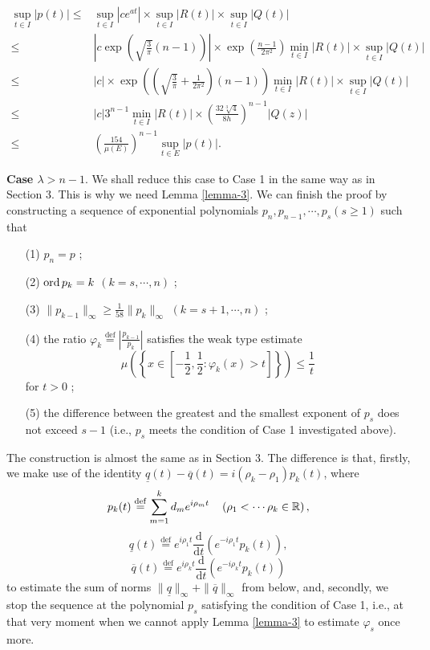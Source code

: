 \begin{equation*}
  \begin{aligned}
    \sup_{t\in I}\left| p(t) \right|\le & \sup_{t\in I}\left| ce^{at} \right|\times  \sup_{t\in I}\left| R(t) \right|\times \sup_{t\in I}\left| Q(t) \right|  \\
    \le  & \left| c\exp\left( \sqrt{\frac{3}{\pi}} (n-1) \right)  \right| \times \exp\left( \frac{n-1}{2\pi^2} \right) \min_{t\in I}\left| R(t) \right| \times \sup_{t\in I}\left| Q(t) \right|\\
    \le  & \left| c \right| \times \exp\left( \left( \sqrt{\frac{3}{\pi}} +\frac{1}{2\pi^2} \right) (n-1) \right) \min_{t\in I}\left| R(t) \right| \times \sup_{t\in I}\left| Q(t) \right|\\
    \le & \left| c \right| 3^{n-1} \min_{t\in I}\left| R(t) \right| \times \left( \frac{32\sqrt[3]{4} }{8h} \right) ^{n-1}\left| Q(z) \right|   \\
    \le  & \left( \frac{154}{\mu(E)} \right)^{n-1}\sup_{t\in E}\left| p(t) \right| . 
  \end{aligned}
\end{equation*}

\textbf{Case $\lambda > n-1$}. We shall reduce this case to Case 1 in the same way as in Section 3. This is why we need Lemma \ref{lemma-3}. We can finish the proof by constructing a sequence of exponential polynomials $p_n,p_{n-1},\cdots,p_s(s\ge 1)$ such that 
\begin{itemize}
  \item [(1)] $p_n=p$ ;
  \item [(2)]  $\operatorname{ord} p_k=k$ $(k=s,\cdots,n)$ ;
  \item [(3)] $\|p_{k-1}\|_{\infty}\ge \frac{1}{58}\|p_k\|_{\infty}$ $(k=s+1,\cdots,n)$ ;
  \item [(4)] the ratio $\varphi_k \overset{\mathrm{def}}{=}\left| \frac{p_{k-1}}{p_k} \right| $ satisfies the weak type estimate 
    $$\mu\left( \left\{ x\in \left[ -\frac{1}{2},\frac{1}{2}:\varphi_k(x)>t \right]  \right\}  \right) \le \frac{1}{t}$$ for $t>0$ ;
  \item [(5)] the difference between the greatest and the smallest exponent of $p_s$ does not exceed $s-1$ (i.e., $p_s$ meets the condition of Case 1 investigated above).
\end{itemize}
The construction is almost the same as in Section 3. The difference is that, firstly, we make use of the identity $\underline{q}(t)-\overline{q}(t)=i\left( \rho_k-\rho_1 \right) p_k(t)$, where 
    \[
      p_k(t)\overset{\mathrm{def}}{=}\sum_{m=1}^{k} d_m e^{i\rho_m t}\quad \left( \rho_1<\cdots\rho_k\in \mathbb{R} \right), 
    \] 
    \[
      \underline{q}(t)\overset{\mathrm{def}}{=}e^{i\rho_1t} \frac{\mathrm{d}}{\mathrm{d}t}\left( e^{-i\rho_1t}p_k(t) \right) ,
    \] 
    \[
      \overline{q}(t)\overset{\mathrm{def}}{=}e^{i\rho_kt} \frac{\mathrm{d}}{\mathrm{d}t}\left( e^{-i\rho_kt}p_k(t) \right) 
    \] 
    to estimate the sum of norms $\|\underline{q}\|_{\infty}+\|\overline{q}\|_{\infty}$ from below, and, secondly, we stop the sequence at the polynomial $p_s$ satisfying the condition of Case 1, i.e., at that very moment when we cannot apply Lemma \ref{lemma-3} to estimate $\varphi_s$ once more.

